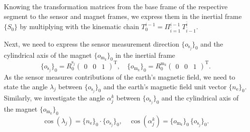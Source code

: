 Knowing the transformation matrices from the base frame of the respective segment to the sensor and magnet frames, we express them in the inertial frame $\{S_{0}\}$ by multiplying with the kinematic chain $T_{0}^{i-1} = \Pi_{\bar{i}=1}^{i-1} \, T_{\bar{i}-1}^{\bar{i}}$.

Next, we need to express the sensor measurement direction $\{ o_{\mathrm{s}_j} \}_{0}$ and the cylindrical axis of the magnet $\{ o_{\mathrm{m}_k} \}_{0}$ in the inertial frame
\begin{equation}
    \{ o_{\mathrm{s}_j} \}_{0} = R_{0}^{\mathrm{s}_j}
    \begin{pmatrix}
        0 & 0 & 1
    \end{pmatrix}^{\mathrm{T}},
    \quad
    \{ o_{\mathrm{m}_k} \}_{0} = R_{0}^{\mathrm{m}_k}
    \begin{pmatrix}
        0 & 0 & 1
    \end{pmatrix}^{\mathrm{T}}.
\end{equation}
%
As the sensor measures contributions of the earth's magnetic field, we need to state the angle $\lambda_{j}$ between $\{ o_{\mathrm{s}_j} \}_0$ and the earth's magnetic field unit vector $\{ n_{\mathrm{e}} \}_{0}$. 
Similarly, we investigate the angle $\alpha_j^k$ between $\{ o_{\mathrm{s}_j} \}_{0}$ and the cylindrical axis of the magnet $\{ o_{\mathrm{m}_k} \}_{0}$
\begin{equation}
    \cos (\lambda_{j}) = \{n_{\mathrm{e}} \}_{0} \cdot \{ o_{\mathrm{s}_j} \}_{0},
    \quad
    \cos (\alpha_{j}^k) = \{ o_{\mathrm{m}_k} \}_{0} \, \{ o_{\mathrm{s}_j} \}_{0}.
\end{equation}
